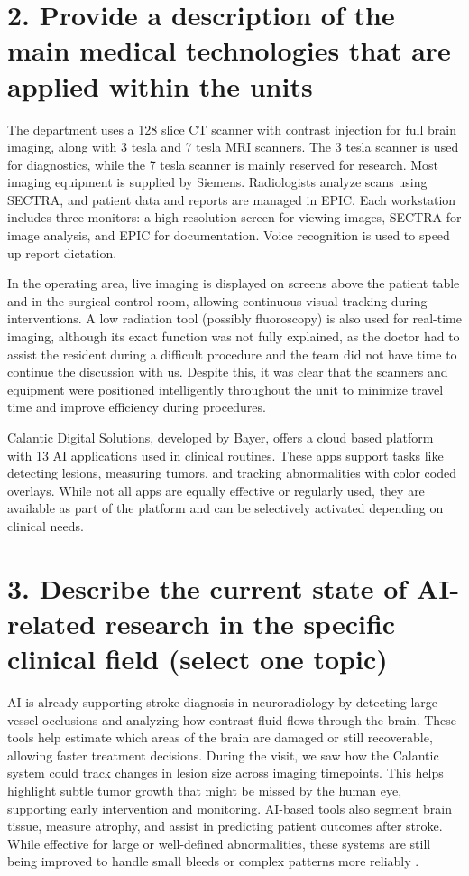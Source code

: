 \documentclass[a4paper, chapterprefix=true, numbers=noenddot]{scrreprt}
\begin{document}
\section*{2. Provide a description of the main medical technologies that are applied within the units}
The department uses a 128 slice CT scanner with contrast injection for full brain imaging, along with 3 tesla and 7 tesla MRI scanners. The 3 tesla scanner is used for diagnostics, while the 7 tesla scanner is mainly reserved for research. Most imaging equipment is supplied by Siemens. Radiologists analyze scans using SECTRA, and patient data and reports are managed in EPIC. Each workstation includes three monitors: a high resolution screen for viewing images, SECTRA for image analysis, and EPIC for documentation. Voice recognition is used to speed up report dictation.\par
\vspace{\baselineskip}
\noindent
In the operating area, live imaging is displayed on screens above the patient table and in the surgical control room, allowing continuous visual tracking during interventions. A low radiation tool (possibly fluoroscopy) is also used for real-time imaging, although its exact function was not fully explained, as the doctor had to assist the resident during a difficult procedure and the team did not have time to continue the discussion with us. Despite this, it was clear that the scanners and equipment were positioned intelligently throughout the unit to minimize travel time and improve efficiency during procedures.\par
\vspace{\baselineskip}
\noindent
Calantic Digital Solutions, developed by Bayer, offers a cloud based platform with 13 AI applications used in clinical routines. These apps support tasks like detecting lesions, measuring tumors, and tracking abnormalities with color coded overlays. While not all apps are equally effective or regularly used, they are available as part of the platform and can be selectively activated depending on clinical needs. \par

\section*{3. Describe the current state of AI-related research in the specific clinical field (select one topic)}
AI is already supporting stroke diagnosis in neuroradiology by detecting large vessel occlusions and analyzing how contrast fluid flows through the brain. These tools help estimate which areas of the brain are damaged or still recoverable, allowing faster treatment decisions. During the visit, we saw how the Calantic system could track changes in lesion size across imaging timepoints. This helps highlight subtle tumor growth that might be missed by the human eye, supporting early intervention and monitoring. AI-based tools also segment brain tissue, measure atrophy, and assist in predicting patient outcomes after stroke. While effective for large or well-defined abnormalities, these systems are still being improved to handle small bleeds or complex patterns more reliably \autocite{InRa}. \par
\end{document}
